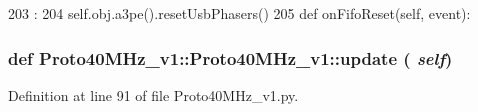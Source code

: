 \begin{DoxyCode}
203                                       :
204         self.obj.a3pe().resetUsbPhasers()
205 
    def onFifoReset(self, event):
\end{DoxyCode}
\hypertarget{classProto40MHz__v1_1_1Proto40MHz__v1_aebbe60409da00f6507197915228ba2e8}{
\subsubsection[{update}]{\setlength{\rightskip}{0pt plus 5cm}def Proto40MHz\_\-v1::Proto40MHz\_\-v1::update ( {\em self})}}
\label{classProto40MHz__v1_1_1Proto40MHz__v1_aebbe60409da00f6507197915228ba2e8}


Definition at line 91 of file Proto40MHz\_\-v1.py.


